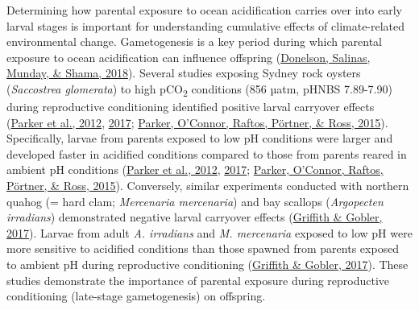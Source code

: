 \documentclass [11pt, proquest] {uwthesis}[2015/03/03]
\begin{document}
Determining how parental exposure to ocean acidification carries over into early larval stages is important for understanding cumulative effects of climate-related environmental change. Gametogenesis is a key period during which parental exposure to ocean acidification can influence offspring (\protect\hyperlink{ref-Donelson2018}{Donelson, Salinas, Munday, \& Shama, 2018}). Several studies exposing Sydney rock oysters (\emph{Saccostrea glomerata}) to high pCO\textsubscript{2} conditions (856 µatm, pHNBS 7.89-7.90) during reproductive conditioning identified positive larval carryover effects (\protect\hyperlink{ref-Parker2012}{Parker et al., 2012}, \protect\hyperlink{ref-Parker2017}{2017}; \protect\hyperlink{ref-Parker2015}{Parker, O'Connor, Raftos, Pörtner, \& Ross, 2015}). Specifically, larvae from parents exposed to low pH conditions were larger and developed faster in acidified conditions compared to those from parents reared in ambient pH conditions (\protect\hyperlink{ref-Parker2012}{Parker et al., 2012}, \protect\hyperlink{ref-Parker2017}{2017}; \protect\hyperlink{ref-Parker2015}{Parker, O'Connor, Raftos, Pörtner, \& Ross, 2015}). Conversely, similar experiments conducted with northern quahog (= hard clam; \emph{Mercenaria mercenaria}) and bay scallops (\emph{Argopecten irradians}) demonstrated negative larval carryover effects (\protect\hyperlink{ref-Griffith2017}{Griffith \& Gobler, 2017}). Larvae from adult \emph{A. irradians} and \emph{M. mercenaria} exposed to low pH were more sensitive to acidified conditions than those spawned from parents exposed to ambient pH during reproductive conditioning (\protect\hyperlink{ref-Griffith2017}{Griffith \& Gobler, 2017}). These studies demonstrate the importance of parental exposure during reproductive conditioning (late-stage gametogenesis) on offspring.
\end{document}
